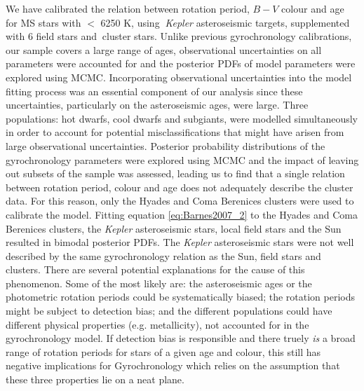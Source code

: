 We have calibrated the relation between rotation period, $B-V$ colour and age
for MS stars with \teff$<$ 6250 K, using \nastero$~${\it Kepler} asteroseismic
targets, supplemented with 6 field stars and \nHC$~$cluster stars.
Unlike previous gyrochronology calibrations, our sample covers a large range
of ages, observational uncertainties on all parameters were accounted for and
the posterior PDFs of model parameters were explored using MCMC.
Incorporating observational uncertainties into the model fitting process was
an essential component of our analysis since these uncertainties, particularly
on the asteroseismic ages, were large.
Three populations: hot dwarfs, cool dwarfs and subgiants, were modelled
simultaneously in order to account for potential misclassifications that
might have arisen from large observational uncertainties.
Posterior probability distributions of the gyrochronology parameters were
explored using MCMC and the impact of leaving out subsets of the sample was
assessed, leading us to find that a single relation between rotation period,
colour and age does not adequately describe the cluster data.
For this reason, only the Hyades and Coma Berenices clusters were used to
calibrate the model.
Fitting equation \ref{eq:Barnes2007_2} to the Hyades and Coma Berenices
clusters, the {\it Kepler} asteroseismic stars, local field stars and the Sun
resulted in bimodal posterior PDFs.
The {\it Kepler} asteroseismic stars were not well described by the same
gyrochronology relation as the Sun, field stars and clusters.
There are several potential explanations for the cause of this phenomenon.
Some of the most likely are: the asteroseismic ages or the photometric
rotation periods could be systematically biased; the rotation periods might be
subject to detection bias; and the different
populations could have different physical properties (e.g. metallicity), not
accounted for in the gyrochronology model.
If detection bias is responsible and there truely {\it is} a broad range of
rotation periods for stars of a given age and colour, this still has
negative implications for Gyrochronology which relies on the assumption that
these three properties lie on a neat plane.


